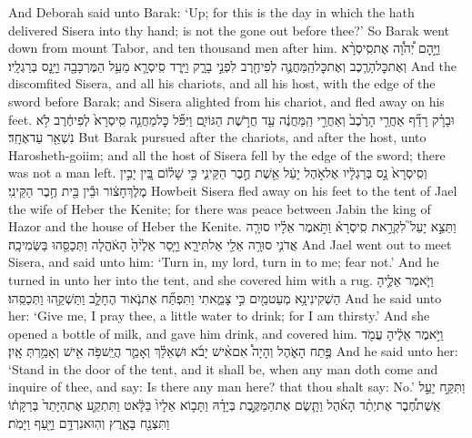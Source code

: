 {And Deborah said unto Barak: ‘Up; for this is the day in which the \lord\space hath delivered Sisera into thy hand; is not the \lord\space gone out before thee?’ So Barak went down from mount Tabor, and ten thousand men after him.}
{וַיָּ֣הׇם יְ֠הֹוָ֠ה אֶת\maqqaf סִֽיסְרָ֨א וְאֶת\maqqaf כׇּל\maqqaf הָרֶ֧כֶב וְאֶת\maqqaf כׇּל\maqqaf הַֽמַּחֲנֶ֛ה לְפִי\maqqaf חֶ֖רֶב לִפְנֵ֣י בָרָ֑ק וַיֵּ֧רֶד סִֽיסְרָ֛א מֵעַ֥ל הַמֶּרְכָּבָ֖ה וַיָּ֥נׇס בְּרַגְלָֽיו׃}
{And the \lord\space discomfited Sisera, and all his chariots, and all his host, with the edge of the sword before Barak; and Sisera alighted from his chariot, and fled away on his feet.}
{וּבָרָ֗ק רָדַ֞ף אַחֲרֵ֤י הָרֶ֙כֶב֙ וְאַחֲרֵ֣י הַֽמַּחֲנֶ֔ה עַ֖ד חֲרֹ֣שֶׁת הַגּוֹיִ֑ם וַיִּפֹּ֞ל כׇּל\maqqaf מַחֲנֵ֤ה סִֽיסְרָא֙ לְפִי\maqqaf חֶ֔רֶב לֹ֥א נִשְׁאַ֖ר עַד\maqqaf אֶחָֽד׃}
{But Barak pursued after the chariots, and after the host, unto Harosheth-goiim; and all the host of Sisera fell by the edge of the sword; there was not a man left.}
{וְסִֽיסְרָא֙ נָ֣ס בְּרַגְלָ֔יו אֶל\maqqaf אֹ֣הֶל יָעֵ֔ל אֵ֖שֶׁת חֶ֣בֶר הַקֵּינִ֑י כִּ֣י שָׁל֗וֹם בֵּ֚ין יָבִ֣ין מֶלֶךְ\maqqaf חָצ֔וֹר וּבֵ֕ין בֵּ֖ית חֶ֥בֶר הַקֵּינִֽי׃}
{Howbeit Sisera fled away on his feet to the tent of Jael the wife of Heber the Kenite; for there was peace between Jabin the king of Hazor and the house of Heber the Kenite.}
{וַתֵּצֵ֣א יָעֵל֮ לִקְרַ֣את סִֽיסְרָא֒ וַתֹּ֣אמֶר אֵלָ֗יו סוּרָ֧ה אֲדֹנִ֛י סוּרָ֥ה אֵלַ֖י אַל\maqqaf תִּירָ֑א וַיָּ֤סַר אֵלֶ֙יהָ֙ הָאֹ֔הֱלָה וַתְּכַסֵּ֖הוּ בַּשְּׂמִיכָֽה׃}
{And Jael went out to meet Sisera, and said unto him: ‘Turn in, my lord, turn in to me; fear not.’ And he turned in unto her into the tent, and she covered him with a rug.}
{וַיֹּ֧אמֶר אֵלֶ֛יהָ הַשְׁקִינִי\maqqaf נָ֥א מְעַט\maqqaf מַ֖יִם כִּ֣י צָמֵ֑אתִי וַתִּפְתַּ֞ח אֶת\maqqaf נֹ֧אוד הֶחָלָ֛ב וַתַּשְׁקֵ֖הוּ וַתְּכַסֵּֽהוּ׃}
{And he said unto her: ‘Give me, I pray thee, a little water to drink; for I am thirsty.’ And she opened a bottle of milk, and gave him drink, and covered him.}
{וַיֹּ֣אמֶר אֵלֶ֔יהָ עֲמֹ֖ד פֶּ֣תַח הָאֹ֑הֶל וְהָיָה֩ אִם\maqqaf אִ֨ישׁ יָבֹ֜א וּשְׁאֵלֵ֗ךְ וְאָמַ֛ר הֲיֵֽשׁ\maqqaf פֹּ֥ה אִ֖ישׁ וְאָמַ֥רְתְּ אָֽיִן׃}
{And he said unto her: ‘Stand in the door of the tent, and it shall be, when any man doth come and inquire of thee, and say: Is there any man here? that thou shalt say: No.’}
{וַתִּקַּ֣ח יָעֵ֣ל אֵֽשֶׁת\maqqaf חֶ֠בֶר אֶת\maqqaf יְתַ֨ד הָאֹ֜הֶל וַתָּ֧שֶׂם אֶת\maqqaf הַמַּקֶּ֣בֶת בְּיָדָ֗הּ וַתָּב֤וֹא אֵלָיו֙ בַּלָּ֔אט וַתִּתְקַ֤ע אֶת\maqqaf הַיָּתֵד֙ בְּרַקָּת֔וֹ וַתִּצְנַ֖ח בָּאָ֑רֶץ וְהֽוּא\maqqaf נִרְדָּ֥ם וַיָּ֖עַף וַיָּמֹֽת׃}
